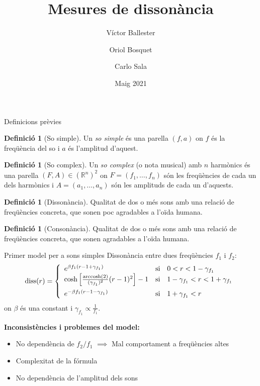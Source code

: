 \documentclass[10pt,hyperref={colorlinks,linkcolor=black,citecolor=blue!80,urlcolor=blue!60},handout]{beamer} %
\institute[UAB]{Taller de modelització\\
\vspace{5pt}Grau en Matemàtiques\\
\vspace{5pt}Universitat Autònoma de Barcelona}
\title[Mesures de dissonància]{Mesures de dissonància}
\author[Víctor, Oriol, Carlo]{Víctor Ballester\and Oriol Bosquet\and Carlo Sala}
\date{Maig 2021}
\theoremstyle{definition}
\newtheorem{defin}[theorem]{Definició}
\DeclareMathOperator{\diss}{diss}
\DeclareMathOperator{\arccosh}{arccosh}
\begin{document}
\frame{\titlepage}
\begin{frame}{Definicions prèvies}
    \begin{defin}[So simple]
        Un \textit{so simple} és una parella $(f,a)$ on $f$ és la freqüència del so i $a$ és l'amplitud d'aquest.
    \end{defin}
    \begin{defin}[So complex]
        Un \textit{so complex} (o nota musical) amb $n$ harmònics és una parella $(F,A)\in{(\mathbb{R}^n)}^2$ on $F = (f_1,\ldots,f_n)$ són les freqüències de cada un dels harmònics i $A = (a_1,\ldots,a_n)$ són les amplituds de cada un d'aquests.
    \end{defin} \pause
    \begin{defin}[Dissonància]
        Qualitat de dos o més sons amb una relació de freqüències concreta, que sonen poc agradables a l'oïda humana.
    \end{defin}
    \begin{defin}[Consonància]
        Qualitat de dos o més sons amb una relació de freqüències concreta, que sonen agradables a l'oïda humana.
    \end{defin}
\end{frame}
\begin{frame}{Primer model per a sons simples}
    Dissonància entre dues freqüències $f_1$ i $f_2$:
    $$\diss(r)=
        \left\{\begin{array}{lll}
            e^{\beta f_1(r-1+\gamma_{f_1})} & \text{si} & 0<r<1-\gamma_{f_1}\\
            \cosh\left[\frac{\arccosh(2)}{(\gamma_{f_1})^2}(r-1)^2\right]-1 & \text{si} & 1-\gamma_{f_1}<r<1+\gamma_{f_1}\vspace{5pt}\\
            e^{-\beta f_1(r-1-\gamma_{f_1})} & \text{si} & 1+\gamma_{f_1}<r
        \end{array}\right.$$ on $\beta$ és una constant i $\gamma_{f_1}\propto\frac{1}{f_1}$.\par\vspace{1cm}\pause
    \textbf{Inconsistències i problemes del model:}
    \begin{itemize}
        \item No dependència de $f_2/f_1$ $\implies$ Mal comportament a freqüències altes\pause
        \item Complexitat de la fórmula\pause
        \item No dependència de l'amplitud dels sons
    \end{itemize}
\end{frame}
\end{document}
